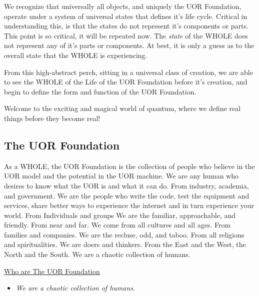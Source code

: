 \documentclass[twocolumn,10pt]{article}
\begin{document}
We recognize that universally all objects,  and uniquely the UOR Foundation, operate under a system of universal states that defines it's life cycle.
Critical in understanding this, is that the states do not represent it's components or parts.
This point is so critical, it will be repeated now.
The \textit{state} of the WHOLE does not represent any of it's parts or components.
At best, it is only a guess as to the overall state that the WHOLE is experiencing.

From this high-abstract perch, sitting in a universal class of creation, we are able to see the WHOLE of the Life of the UOR Foundation before it's creation, and begin to define the form and function of the UOR Foundation.

Welcome to the exciting and magical world of quantum, where we define real things before they become real!

\subsection*{The UOR Foundation}
As a WHOLE, the UOR Foundation is the collection of people who believe in the UOR model and the potential in the UOR machine.
We are any human who desires to know what the UOR is and what it can do.
From industry, academia, and government.
We are the people who write the code, test the equipment and services, share better ways to experience the internet and in turn experience your world.
From Individuals and groups
We are the familiar, approachable, and friendly.
From near and far.
We come from all cultures and all ages.
From families and companies.
We are the recluse, odd, and taboo.
From all religions and spiritualities.
We are doers and thinkers.
From the East and the West, the North and the South.
We are a chaotic collection of humans.

\vspace{20pt}
\begin{minipage}{0.95\linewidth}
    \begin{tcolorbox}
    \begin{center}\underline{Who are The UOR Foundation}\end{center}
        \begin{itemize}
            \item \textit{We are a chaotic collection of humans.}
        \end{itemize}
    \end{tcolorbox}
\end{minipage}
\vspace{10pt}
\end{document}
